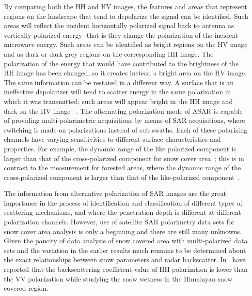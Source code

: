\begin{description}
	By comparing both the $\mbox{HH}$ and $\mbox{HV}$ images, the features and areas that represent regions on the landscape that tend to depolarize the signal can be identified. Such areas will reflect the incident horizontally polarized signal back to antenna as vertically polarized energy- that is they change the polarization of the incident microwave energy. Such areas can be identified as bright regions on the $\mbox{HV}$ image and as dark or dark grey regions on the corresponding HH image. The polarization of the energy that would have contributed to the brightness of the $\mbox{HH}$ image has been changed, so it creates instead a bright area on the HV image. The same information can be restated in a different way. A surface that is an ineffective depolarizer will tend to scatter energy in the same polarization in which it was transmitted; such areas will appear bright in the HH image and dark on the HV image ~\citep{campbell2002introduction}. The alternating polarization mode of ASAR is capable of providing multi-polarimetric acquisitions by means of SAR acquisitions, where switching is made on polarizations instead of sub swaths. Each of these polarizing channels have varying sensitivities to different surface characteristics and properties. For example, the dynamic range of the like polarized component is larger than that of the cross-polarized component for snow cover area~\citep{shi1997estimation}; this is in contrast to the measurement for forested areas, where the dynamic range of the cross-polarized component is larger than that of the like-polarized component~\citep{dong1997radar}. 
	
	The information from alternative polarization of SAR images are the great importance in the process of identification and classification of different types of scattering mechanisms, and where the penetration depth is different at different polarization channels. However, use of satellite SAR polarimetry data sets for snow cover area analysis is only a beginning and there are still many unknowns. Given the paucity of data analysis of snow covered area with multi-polarized data sets and the variation in the earlier results much remains to be determined about the exact relationships between snow parameters and radar backscatter. In~\citep{venkataraman2008snow}  have reported that the backscattering coefficient value of $\mbox{HH}$ polarization is lower than the $\mbox{VV}$ polarization while studying the snow wetness in the Himalayan snow covered region. 
\end{description}
